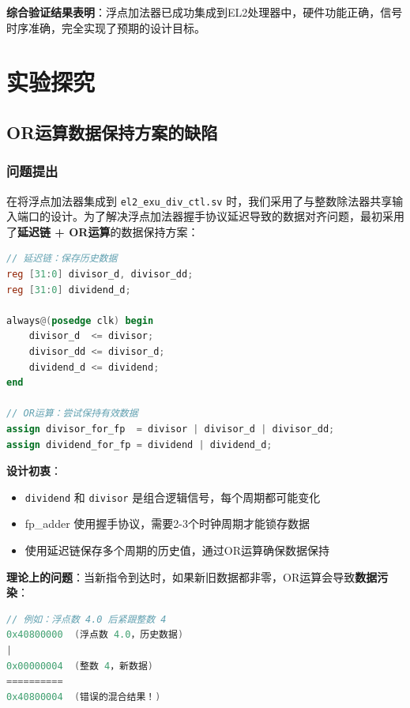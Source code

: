 \documentclass[12pt,a4paper]{article}
\begin{document}
\textbf{综合验证结果表明}：浮点加法器已成功集成到EL2处理器中，硬件功能正确，信号时序准确，完全实现了预期的设计目标。

\clearpage
\section{实验探究}

\subsection{OR运算数据保持方案的缺陷}

\subsubsection{问题提出}

在将浮点加法器集成到 \texttt{el2\_exu\_div\_ctl.sv} 时，我们采用了与整数除法器共享输入端口的设计。为了解决浮点加法器握手协议延迟导致的数据对齐问题，最初采用了\textbf{延迟链 + OR运算}的数据保持方案：

\begin{lstlisting}[language=Verilog]
// 延迟链：保存历史数据
reg [31:0] divisor_d, divisor_dd;
reg [31:0] dividend_d;

always@(posedge clk) begin
    divisor_d  <= divisor;
    divisor_dd <= divisor_d;
    dividend_d <= dividend;
end

// OR运算：尝试保持有效数据
assign divisor_for_fp  = divisor | divisor_d | divisor_dd;
assign dividend_for_fp = dividend | dividend_d;
\end{lstlisting}

\textbf{设计初衷}：
\begin{itemize}[itemsep=0pt, parsep=3pt]
    \item \texttt{dividend} 和 \texttt{divisor} 是组合逻辑信号，每个周期都可能变化
    \item fp\_adder 使用握手协议，需要2-3个时钟周期才能锁存数据
    \item 使用延迟链保存多个周期的历史值，通过OR运算确保数据保持
\end{itemize}

\textbf{理论上的问题}：当新指令到达时，如果新旧数据都非零，OR运算会导致\textbf{数据污染}：

\begin{lstlisting}[language=Verilog]
// 例如：浮点数 4.0 后紧跟整数 4
0x40800000  (浮点数 4.0，历史数据)
|
0x00000004  (整数 4，新数据)
==========
0x40800004  (错误的混合结果！)
\end{lstlisting}
\end{document}
